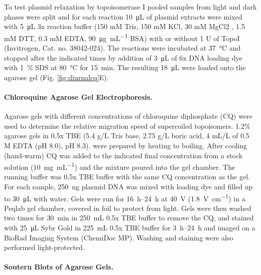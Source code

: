 \documentclass[10pt,a4]{article}
\newcommand{\ugml}{\micro\gram\per\milli\liter}
\newcommand{\mL}{\milli\liter}
\begin{document}
To test plasmid relaxation by topoisomerase I pooled samples from
light and dark phases were split and for each reaction \SI{10}{\uL} of
plasmid extracts were mixed with \SI{5}{\uL} 3x reaction buffer (150
mM Tris, 150 mM KCl, 30 mM MgCl2 , 1.5 mM DTT, 0.3 mM EDTA,
\SI{90}{\ugml} BSA) with or without 1 U of TopoI (Invitrogen,
Cat. no. 38042-024). The reactions were incubated at \SI{37}{\celsius}
and stopped after the indicated times by addition of \SI{3}{\uL} of 6x
DNA loading dye with \SI{1}{\percent} SDS at \SI{80}{\celsius} for
\SI{15}{\minute}. The resulting \SI{18}{\uL} were loaded onto the
agarose gel (Fig. \ref{fig:diurnalcq}E).

\paragraph{Chloroquine Agarose Gel Electrophoresis.}
Agarose gels with different concentrations of chloroquine diphosphate
(CQ) were used to determine the relative migration speed of
supercoiled topoisomers. 1.2\% agarose gels in 0.5x TBE (5.4 g/L Tris
base, 2.75 g/L boric acid, 4 mL/L of 0.5 M EDTA (pH 8.0), pH 8.3).
were prepared by heating to boiling. After cooling (hand-warm) CQ was
added to the indicated final concentration from a stock solution
(\SI{10}{\milli\gram\per\milli\liter}) and the mixture poured into the
gel chamber. The running buffer was 0.5x TBE buffer with the same CQ
concentration as the gel. For each sample, \SI{250}{\ng} plasmid DNA
was mixed with loading dye and filled up to \SI{30}{\uL} with water.
Gels were run for \SIrange{16}{24}{\hour} at \SI{40}{\volt}
(\SI{1.8}{\volt\per\cm}) in a Peqlab gel chamber, covered in foil to
protect from light. Gels were then washed two times for
\SI{30}{\minute} in \SI{250}{\mL} 0.5x TBE buffer to remove the CQ,
and stained with \SI{25}{\uL} Sybr Gold in \SI{225}{\mL} 0.5x TBE
buffer for \SIrange{3}{24}{\hour} and imaged on a BioRad Imaging
System (ChemiDoc MP). Washing and staining were also performed
light-protected.

\paragraph{Soutern Blots of Agarose Gels.}
\end{document}
